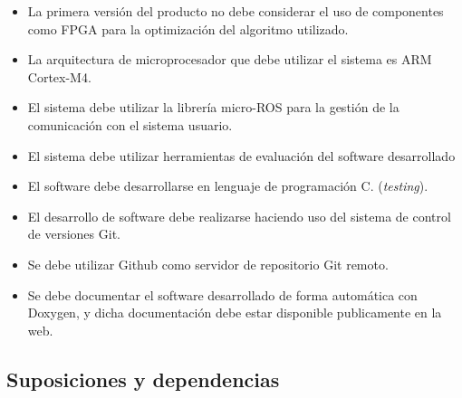 \documentclass[12pt,a4paper, twosite]{article}
\begin{document}








\begin{itemize}
  \item La primera versión del producto no debe considerar el uso de componentes como FPGA para la
  optimización del algoritmo utilizado.
  \item La arquitectura de microprocesador que debe utilizar el sistema es ARM Cortex-M4.
  \item El sistema debe utilizar la librería micro-ROS para la gestión de la comunicación con
  el sistema usuario.
  \item El sistema debe utilizar herramientas de evaluación del software desarrollado
  \item El software debe desarrollarse en lenguaje de programación C.
  (\textit{testing}).
  \item El desarrollo de software debe realizarse haciendo uso del sistema de control de versiones
  Git.
  \item Se debe utilizar Github como servidor de repositorio Git remoto.
  \item Se debe documentar el software desarrollado de forma automática con Doxygen, y dicha
  documentación debe estar disponible publicamente en la web.
\end{itemize}

\subsection{Suposiciones y dependencias}
\label{sec:org0ae23fe}

\end{document}
